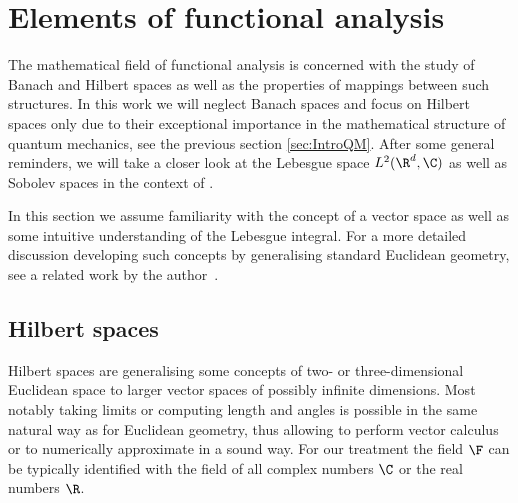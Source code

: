 \section{Elements of functional analysis}
\label{sec:FunAna}

The mathematical field of functional analysis
is concerned with the study of Banach and Hilbert spaces
as well as the properties of mappings between such structures.
In this work we will neglect Banach spaces
and focus on Hilbert spaces only
due to their exceptional importance in the mathematical structure
of quantum mechanics, see the previous section \ref{sec:IntroQM}.
After some general reminders, we will take a closer look
at the Lebesgue space $L^2(\R^d, \C)$
as well as Sobolev spaces in the context of \QM.

In this section we assume familiarity with the concept of a vector space
as well as some intuitive understanding of the Lebesgue integral.
For a more detailed discussion developing such concepts
by generalising standard Euclidean geometry,
see a related work by the author~\cite{DiracNotation}.

\subsection{Hilbert spaces}
\label{sec:Hilbert}

Hilbert spaces are generalising some concepts of
two- or three-dimensional Euclidean space to
larger vector spaces of possibly infinite dimensions.
Most notably taking limits or computing length and angles
is possible in the same natural way as for Euclidean geometry,
thus allowing to perform vector calculus or
to numerically approximate in a sound way.
For our treatment the field $\F$ can be typically identified
with the field of all complex numbers $\C$ or the real numbers $\R$.

